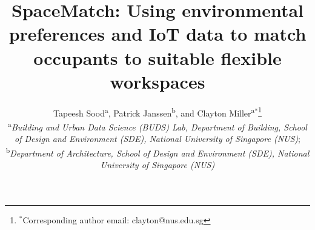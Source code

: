 \documentclass[]{interact}
\theoremstyle{plain}%
\theoremstyle{definition}
\theoremstyle{remark}
\begin{document}

\title{SpaceMatch: Using environmental preferences and IoT data to match occupants to suitable flexible workspaces}

\author{Tapeesh Sood\textsuperscript{a},
Patrick Janssen\textsuperscript{b},
and Clayton Miller\textsuperscript{a}$^{\ast}$\thanks{$^\ast$Corresponding author email: clayton@nus.edu.sg}\\
\vspace{6pt}
\textsuperscript{a}{\em Building and Urban Data Science (BUDS) Lab, Department of Building, School of Design and Environment (SDE), National University of Singapore (NUS)};\\
\textsuperscript{b}{\em Department of Architecture, School of Design and Environment (SDE), National University of Singapore (NUS)}
}

\maketitle
\end{document}
